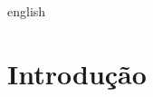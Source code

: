 \documentclass[12pt,openright,twoside,a4paper,english,french,spanish,brazil]{abntex2}
\begin{document}

\begin{resumo} 
 
\end{resumo}

\begin{resumo}[Abstract]
 \begin{otherlanguage*}{english}
  
 \end{otherlanguage*}
\end{resumo}

\listoffigures*
\cleardoublepage

\listoftables*
\cleardoublepage



\tableofcontents*
\cleardoublepage



\textual

\chapter*[Introdução]{Introdução}
\end{document}
